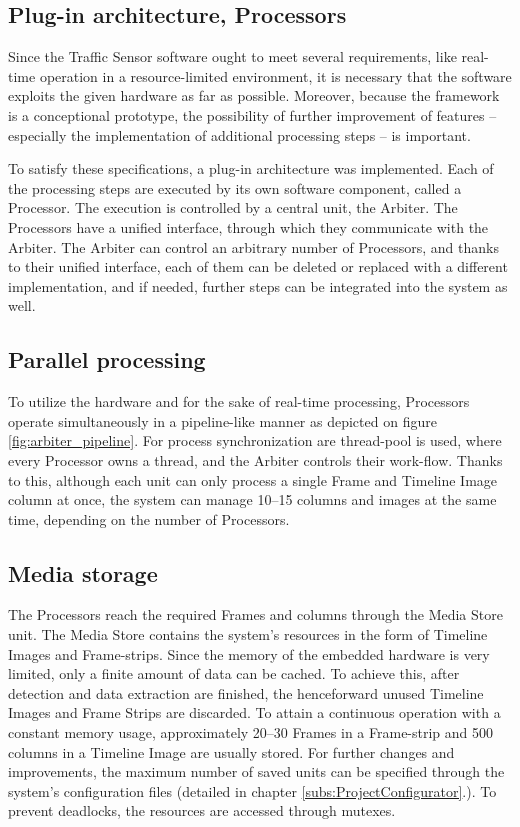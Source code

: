 \subsection{Plug-in architecture, Processors}
Since the Traffic Sensor software ought to meet several requirements, like real-time operation in a resource-limited environment, it is necessary that the software exploits the given hardware as far as possible.
Moreover, because the framework is a conceptional prototype, the possibility of further improvement of features -- especially the implementation of additional processing steps -- is important.

To satisfy these specifications, a plug-in architecture was implemented.
Each of the processing steps are executed by its own software component, called a Processor.
The execution is controlled by a central unit, the Arbiter.
The Processors have a unified interface, through which they communicate with the Arbiter.
The Arbiter can control an arbitrary number of Processors, and thanks to their unified interface, each of them can be deleted or replaced with a different implementation, and if needed, further steps can be integrated into the system as well.

\subsection{Parallel processing}
To utilize the hardware and for the sake of real-time processing, Processors operate simultaneously in a pipeline-like manner as depicted on figure \ref{fig:arbiter_pipeline}.
For process synchronization are thread-pool is used, where every Processor owns a thread, and the Arbiter controls their work-flow.
Thanks to this, although each unit can only process a single Frame and Timeline Image column at once, the system can manage 10--15 columns and images at the same time, depending on the number of Processors.

\subsection{Media storage}
The Processors reach the required Frames and columns through the Media Store unit.
The Media Store contains the system's resources in the form of Timeline Images and Frame-strips.
Since the memory of the embedded hardware is very limited, only a finite amount of data can be cached.
To achieve this, after detection and data extraction are finished, the henceforward unused Timeline Images and Frame Strips are discarded.
To attain a continuous operation with a constant memory usage, approximately 20--30 Frames in a Frame-strip and 500 columns in a Timeline Image are usually stored.
For further changes and improvements, the maximum number of saved units can be specified through the system's configuration files (detailed in chapter \ref{subs:ProjectConfigurator}.).
To prevent deadlocks, the resources are accessed through mutexes.

